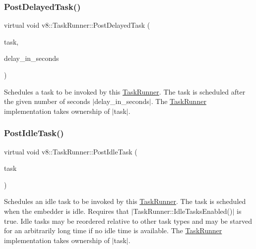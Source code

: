 \mbox{\label{classv8_1_1TaskRunner_a8ae45842086210292d966e2e326629a4}} 
\subsubsection{\texorpdfstring{Post\+Delayed\+Task()}{PostDelayedTask()}}
{\footnotesize\ttfamily virtual void v8\+::\+Task\+Runner\+::\+Post\+Delayed\+Task (\begin{DoxyParamCaption}\item[{std\+::unique\+\_\+ptr$<$ \mbox{\hyperlink{classv8_1_1Task}{Task}} $>$}]{task,  }\item[{double}]{delay\+\_\+in\+\_\+seconds }\end{DoxyParamCaption})\hspace{0.3cm}{\ttfamily [pure virtual]}}

Schedules a task to be invoked by this \mbox{\hyperlink{classv8_1_1TaskRunner}{Task\+Runner}}. The task is scheduled after the given number of seconds $\vert$delay\+\_\+in\+\_\+seconds$\vert$. The \mbox{\hyperlink{classv8_1_1TaskRunner}{Task\+Runner}} implementation takes ownership of $\vert$task$\vert$. \mbox{\label{classv8_1_1TaskRunner_a0ebfb362d1cb3fa621f0f50b9ff0fb6f}} 
\subsubsection{\texorpdfstring{Post\+Idle\+Task()}{PostIdleTask()}}
{\footnotesize\ttfamily virtual void v8\+::\+Task\+Runner\+::\+Post\+Idle\+Task (\begin{DoxyParamCaption}\item[{std\+::unique\+\_\+ptr$<$ \mbox{\hyperlink{classv8_1_1IdleTask}{Idle\+Task}} $>$}]{task }\end{DoxyParamCaption})\hspace{0.3cm}{\ttfamily [pure virtual]}}

Schedules an idle task to be invoked by this \mbox{\hyperlink{classv8_1_1TaskRunner}{Task\+Runner}}. The task is scheduled when the embedder is idle. Requires that $\vert$\+Task\+Runner\+::\+Idle\+Tasks\+Enabled()$\vert$ is true. Idle tasks may be reordered relative to other task types and may be starved for an arbitrarily long time if no idle time is available. The \mbox{\hyperlink{classv8_1_1TaskRunner}{Task\+Runner}} implementation takes ownership of $\vert$task$\vert$. \mbox{\label{classv8_1_1TaskRunner_ab2b73f380765e09c9ae401182a92d8e9}} 
